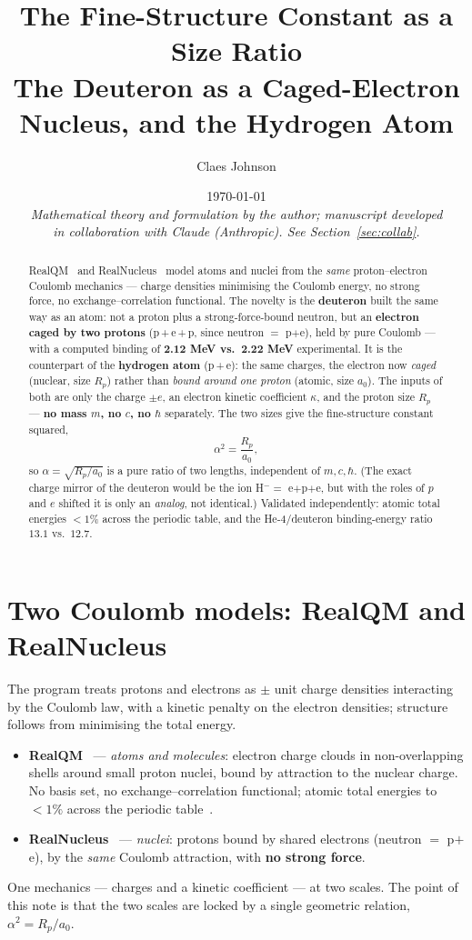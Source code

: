 \documentclass[11pt]{article}
\title{\textbf{The Fine-Structure Constant as a Size Ratio}\\[0.3em]
\large The Deuteron as a Caged-Electron Nucleus, and the Hydrogen Atom}
\author[1]{Claes Johnson}
\affil[1]{KTH Royal Institute of Technology, Stockholm, Sweden \\ \texttt{claesjohnson@gmail.com}}
\date{\today \\[0.4em]
\small\textit{Mathematical theory and formulation by the author; manuscript developed} \\
\small\textit{in collaboration with Claude (Anthropic). See Section~\ref{sec:collab}.}}
\begin{document}
\maketitle

\begin{abstract}
RealQM~\cite{realqm} and RealNucleus~\cite{realnucleus} model atoms and nuclei from the \emph{same}
proton--electron Coulomb mechanics --- charge densities minimising the Coulomb energy, no strong force, no
exchange--correlation functional. The novelty is the \textbf{deuteron} built the same way as an atom: not a
proton plus a strong-force-bound neutron, but an \textbf{electron caged by two protons} (p\,+\,e\,+\,p, since
neutron $=$ p$+$e), held by pure Coulomb --- with a computed binding of \textbf{2.12 MeV vs.\ 2.22 MeV}
experimental. It is the counterpart of the \textbf{hydrogen atom} (p\,+\,e): the same charges, the electron
now \emph{caged} (nuclear, size $R_p$) rather than \emph{bound around one proton} (atomic, size $a_0$). The
inputs of both are only the charge $\pm e$, an electron kinetic coefficient $\kappa$, and the proton size
$R_p$ --- \textbf{no mass $m$, no $c$, no $\hbar$} separately. The two sizes give the fine-structure constant
squared,
\[ \alpha^2=\frac{R_p}{a_0}, \]
so $\alpha=\sqrt{R_p/a_0}$ is a pure ratio of two lengths, independent of $m,c,\hbar$. (The exact charge
mirror of the deuteron would be the ion H$^-=$ e$+$p$+$e, but with the roles of $p$ and $e$ shifted it is
only an \emph{analog}, not identical.) Validated independently: atomic total energies $<1\%$ across the
periodic table, and the He-4/deuteron binding-energy ratio $13.1$ vs.\ $12.7$.
\end{abstract}

\section{Two Coulomb models: RealQM and RealNucleus}\label{sec:models}
The program treats protons and electrons as $\pm$ unit charge densities interacting by the Coulomb law, with
a kinetic penalty on the electron densities; structure follows from minimising the total energy.
\begin{itemize}
\item \textbf{RealQM}~\cite{realqm} --- \emph{atoms and molecules}: electron charge clouds in non-overlapping
shells around small proton nuclei, bound by attraction to the nuclear charge. No basis set, no
exchange--correlation functional; atomic total energies to $<1\%$ across the periodic table~\cite{atoms}.
\item \textbf{RealNucleus}~\cite{realnucleus} --- \emph{nuclei}: protons bound by shared electrons (neutron
$=$ p$+$e), by the \emph{same} Coulomb attraction, with \textbf{no strong force}.
\end{itemize}
One mechanics --- charges and a kinetic coefficient --- at two scales. The point of this note is that the two
scales are locked by a single geometric relation, $\alpha^2=R_p/a_0$.
\end{document}

